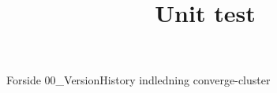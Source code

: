 \documentclass[a4paper,openany]{memoir}
\title{Unit test}
\begin{document}
	{Forside}  \newpage
	\tableofcontents\thispagestyle{fancy}
	{00_VersionHistory}  \newpage
	{indledning}  \newpage
	{converge-cluster}  \newpage
	
	 {}
	\printbibliography
\end{document}

